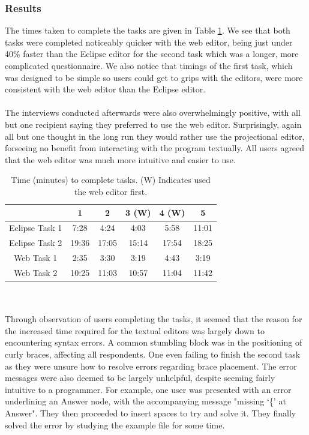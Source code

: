 \documentclass{article}
\begin{document}
{\subsubsection{Results}
The times taken to complete the tasks are given in Table \ref{Tab:questionnaireResults}. We see that both tasks were completed noticeably quicker with the web editor, being just under 40\% faster than the Eclipse editor for the second task which was a longer, more complicated questionnaire. We also notice that timings of the first task, which was designed to be simple so users could get to grips with the editors, were more consistent with the web editor than the Eclipse editor.
\\
\\
The interviews conducted afterwards were also overwhelmingly positive, with all but one recipient saying they preferred to use the web editor. Surprisingly, again all but one thought in the long run they would rather use the projectional editor, forseeing no benefit from interacting with the program textually. All users agreed that the web editor was much more intuitive and easier to use.
\begin{table}[ht]
\centering
	\begin{tabular}{| c | c | c | c | c | c |}
	\hline
	& 1  & 2 & 3 (W) & 4 (W) & 5 \\
	\hline 
	Eclipse Task 1 & 7:28 & 4:24 & 4:03 & 5:58 & 11:01 \\
	Eclipse Task 2 & 19:36 & 17:05 & 15:14 & 17:54 & 18:25 \\
	Web Task 1 & 2:35 & 3:30 & 3:19 & 4:43 & 3:19 \\
	Web Task 2 & 10:25 & 11:03 & 10:57 & 11:04 & 11:42 \\
	\hline
	\end{tabular}
	\caption{Time (minutes) to complete tasks. (W) Indicates used the web editor first.}
	\label{Tab:questionnaireResults}
\end{table}
\\
\\
Through observation of users completing the tasks, it seemed that the reason for the increased time required for the textual editors was largely down to encountering syntax errors. A common stumbling block was in the positioning of curly braces, affecting all respondents. One even failing to finish the second task as they were unsure how to resolve errors regarding brace placement. The error messages were also deemed to be largely unhelpful, despite seeming fairly intuitive to a programmer. For example, one user was presented with an error underlining an Answer node, with the accompanying message "missing `\{' at Answer". They then proceeded to insert spaces to try and solve it. They finally solved the error by studying the example file for some time. 
}
\end{document}
